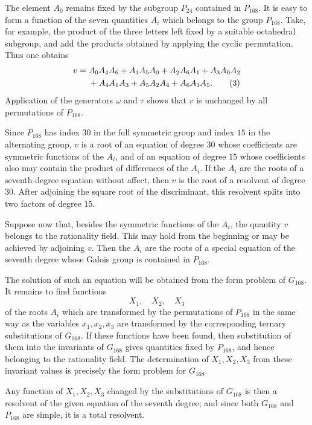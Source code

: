 \documentclass[11pt,a4paper]{book}
\begin{document}
The element \(A_0\) remains fixed by the subgroup \(P_{24}\) contained in \(P_{168}\).  It is easy to form a function of the seven quantities \(A_i\) which belongs to the group \(P_{168}\).  Take, for example, the product of the three letters left fixed by a suitable octahedral subgroup, and add the products obtained by applying the cyclic permutation.  Thus one obtains
\begin{align}
 v={}&A_0A_4A_6+A_1A_5A_0+A_2A_6A_1+A_3A_0A_2\notag\\
 &+A_4A_1A_3+A_5A_2A_4+A_6A_3A_5. \tag{3}
\end{align}
Application of the generators \(\omega\) and \(\tau\) shows that \(v\) is unchanged by all permutations of \(P_{168}\).

Since \(P_{168}\) has index \(30\) in the full symmetric group and index \(15\) in the alternating group, \(v\) is a root of an equation of degree \(30\) whose coefficients are symmetric functions of the \(A_i\), and of an equation of degree \(15\) whose coefficients also may contain the product of differences of the \(A_i\).  If the \(A_i\) are the roots of a seventh-degree equation without affect, then \(v\) is the root of a resolvent of degree \(30\).  After adjoining the square root of the discriminant, this resolvent splits into two factors of degree \(15\).

Suppose now that, besides the symmetric functions of the \(A_i\), the quantity \(v\) belongs to the rationality field.  This may hold from the beginning or may be achieved by adjoining \(v\).  Then the \(A_i\) are the roots of a special equation of the seventh degree whose Galois group is contained in \(P_{168}\).

The solution of such an equation will be obtained from the form problem of \(G_{168}\).  It remains to find functions
\[
 X_1,
\quad X_2,
\quad X_3
\]
of the roots \(A_i\) which are transformed by the permutations of \(P_{168}\) in the same way as the variables \(x_1,x_2,x_3\) are transformed by the corresponding ternary substitutions of \(G_{168}\).  If these functions have been found, then substitution of them into the invariants of \(G_{168}\) gives quantities fixed by \(P_{168}\), and hence belonging to the rationality field.  The determination of \(X_1,X_2,X_3\) from these invariant values is precisely the form problem for \(G_{168}\).

Any function of \(X_1,X_2,X_3\) changed by the substitutions of \(G_{168}\) is then a resolvent of the given equation of the seventh degree; and since both \(G_{168}\) and \(P_{168}\) are simple, it is a total resolvent.
\end{document}
